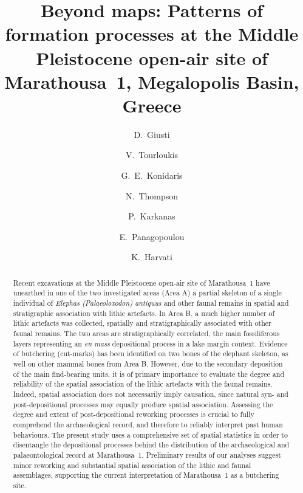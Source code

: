 \documentclass[preprint,authoryear,times]{elsarticle} %
\begin{document}
\begin{frontmatter}
  
  \title{Beyond maps: Patterns of formation processes at the Middle Pleistocene open-air site of Marathousa~1, Megalopolis Basin, Greece}
  
  \author[tue]{D.~Giusti}
  
  \author[tue]{V.~Tourloukis}
  \author[tue]{G.~E.~Konidaris}
  \author[tue]{N.~Thompson}
  \author[wiener]{P.~Karkanas}
  \author[ephoreia]{E.~Panagopoulou}
  \author[tue]{K.~Harvati}
  
  \address[tue]{Paläoanthropologie, Senckenberg Centre for Human Evolution and Palaeoenvironment, Eberhard Karls Universität Tübingen, Rümelinstr. 23, 72070 Tübingen, Germany}
  \address[erlangen]{Friedrich-Alexander University of Erlangen-Nürnberg, Institute of Prehistory and Early History, Kochstr. 4/18, 90154 Erlangen, Germany}
  \address[wiener]{Malcolm H. Wiener Laboratory for Archaeological Science, American School of Classical Studies at Athens, Greece}
  \address[ephoreia]{Ephoreia of Palaeoanthropology-Speleology of Greece, Athens, Greece}

  \begin{abstract}
    Recent excavations at the Middle Pleistocene open-air site of Marathousa~1 have unearthed in one of the two investigated areas (Area A) a partial skeleton of a single individual of \emph{Elephas (Palaeoloxodon) antiquus} and other faunal remains in spatial and stratigraphic association with lithic artefacts. In Area B, a much higher number of lithic artefacts was collected, spatially and stratigraphically associated with other faunal remains. The two areas are stratigraphically correlated, the main fossiliferous layers representing an \emph{en mass} depositional process in a lake margin context. Evidence of butchering (cut-marks) has been identified on two bones of the elephant skeleton, as well on other mammal bones from Area B. However, due to the secondary deposition of the main find-bearing units, it is of primary importance to evaluate the degree and reliability of the spatial association of the lithic artefacts with the faunal remains. Indeed, spatial association does not necessarily imply causation, since natural syn- and post-depositional processes may equally produce spatial association. Assessing the degree and extent of post-depositional reworking processes is crucial to fully comprehend the archaeological record, and therefore to reliably interpret past human behaviours. The present study uses a comprehensive set of spatial statistics in order to disentangle the depositional processes behind the distribution of the archaeological and palaeontological record at Marathousa~1. Preliminary results of our analyses suggest minor reworking and substantial spatial association of the lithic and faunal assemblages, supporting the current interpretation of Marathousa~1 as a butchering site.
  \end{abstract}


\end{frontmatter}
\end{document}
